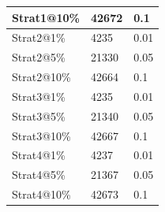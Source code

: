 \begin{figure}[!t]
\begin{minipage}[t]{0.495\columnwidth}
\begin{minipage}[t]{1.0\columnwidth}
\begin{minipage}[t]{1.0\columnwidth}
{\begin{tabular}{|l|l|l|}
Strat1@10\%                                                  & 42672                                                  & 0.1                                                     \\ \hline
Strat2@1\%                                                   & 4235                                                   & 0.01                                                    \\ \hline
Strat2@5\%                                                   & 21330                                                  & 0.05                                                    \\ \hline
Strat2@10\%                                                  & 42664                                                  & 0.1                                                     \\ \hline
Strat3@1\%                                                   & 4235                                                   & 0.01                                                    \\ \hline
Strat3@5\%                                                   & 21340                                                  & 0.05                                                    \\ \hline
Strat3@10\%                                                  & 42667                                                  & 0.1                                                     \\ \hline
Strat4@1\%                                                   & 4237                                                   & 0.01                                                    \\ \hline
Strat4@5\%                                                   & 21367                                                  & 0.05                                                    \\ \hline
Strat4@10\%                                                  & 42673                                                  & 0.1                                                     \\ \hline
\end{tabular}
}

\label{tab:income_samples}
\end{minipage}
\end{minipage}
\end{minipage}
\end{figure}


